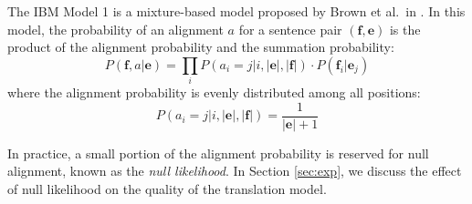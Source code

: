 \documentclass[12pt]{article}   %
\begin{document}
The IBM Model 1 is a mixture-based model proposed by Brown et al.~in \cite{ibm-models}. In this model, the probability of an alignment $a$ for a sentence pair $(\mathbf{f}, \mathbf{e})$ is the product of the alignment probability and the summation probability:
$$ P(\mathbf{f}, a|\mathbf{e}) = \prod_{i} P(a_i = j|i, |\mathbf{e}|, |\mathbf{f}|) \cdot P(\mathbf{f}_i|\mathbf{e}_j) $$
where the alignment probability is evenly distributed among all positions:
$$ P(a_i = j|i, |\mathbf{e}|, |\mathbf{f}|) = \frac{1}{|\mathbf{e}| + 1} $$

In practice, a small portion of the alignment probability is reserved for null alignment, known as the \emph{null likelihood}. In Section \ref{sec:exp}, we discuss the effect of null likelihood on the quality of the translation model.
\end{document}
